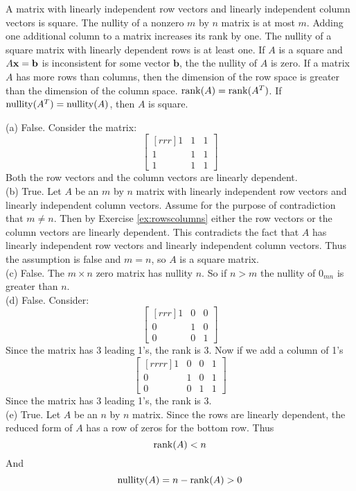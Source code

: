 \ii A matrix with linearly independent row vectors and linearly independent column vectors is square.
\ii The nullity of a nonzero $m$ by $n$ matrix is at most $m$.
\ii Adding one additional column to a matrix increases its rank by one.
\ii The nullity of a square matrix with linearly dependent rows is at least one.
\ii If $A$ is a square and $A{\mathbf x} = \textbf{b}$ is inconsistent for some vector $\textbf{b}$, the the nullity of $A$ is zero.
\ii If a matrix $A$ has more rows than columns, then the dimension of the row space is greater than the dimension of the column space.
\ii $\operatorname{rank}(A)=\operatorname{rank}(A^T)$. 
\ii If $\operatorname{nullity}(A^T)=\operatorname{nullity}(A)$, then $A$ is square. 
\ee
\begin{solution}
\noindent (a) 
False. Consider the matrix:
$$
\begin{bmatrix}[rrr]
1&1&1\\
1&1&1\\
1&1&1
\end{bmatrix}
$$
Both the row vectors and the column vectors are linearly dependent.
\\
(b) True. Let $A$ be an $m$ by $n$ matrix with linearly independent row vectors and linearly independent column vectors. Assume for the purpose of contradiction that $m \neq n$. Then by Exercise \ref{ex:rowscolumns} either the row vectors or the column vectors are linearly dependent. This contradicts the fact that $A$ has linearly independent row vectors and linearly independent column vectors. Thus the assumption is false and $m = n$, so $A$ is a square matrix.
\\
(c) False. The $m\times n$ zero matrix has nullity $n$. So if $n>m$ the nullity of $0_{mn}$ is greater than $n$.  
\\
(d) False. Consider:
$$
\begin{bmatrix}[rrr]
1&0&0\\
0&1&0\\
0&0&1
\end{bmatrix}
$$
Since the matrix has 3 leading 1's, the rank is 3. Now if we add a column of 1's
$$
\begin{bmatrix}[rrrr]
1&0&0&1\\
0&1&0&1\\
0&0&1&1
\end{bmatrix}
$$
Since the matrix has 3 leading 1's, the rank is 3.
\\
(e) True. Let $A$ be an $n$ by $n$ matrix. Since the rows are linearly dependent, the reduced form of $A$ has a row of zeros for the bottom row. Thus $$\operatorname{rank}(A) < n$$ And $$\operatorname{nullity}(A) = n - \operatorname{rank}(A) > 0$$

\end{solution}
